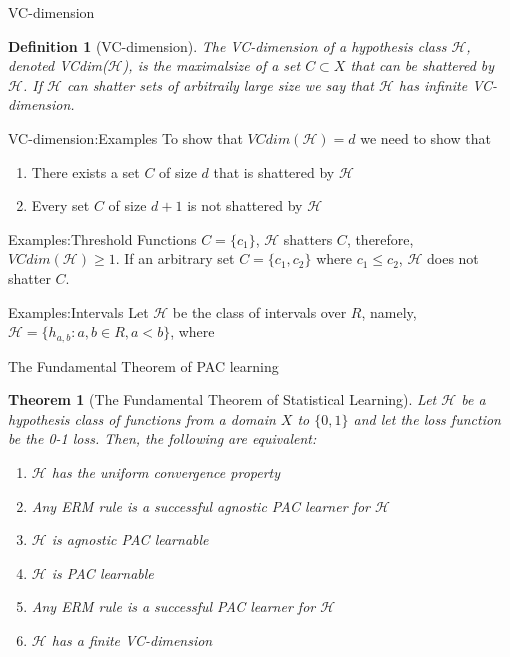 \documentclass{beamer}
\newtheorem*{dfn}{Definition}
\newtheorem{thm}{Theorem}[subsection]
\begin{document}
\begin{frame}{VC-dimension}
	\begin{dfn}[VC-dimension]
		The VC-dimension of a hypothesis class $\mathcal{H}$, denoted VCdim($\mathcal{H}$), is the maximalsize of a set $C \subset X$ that can be shattered by $\mathcal{H}$. If $\mathcal{H}$ can shatter sets of arbitraily large size we say that $\mathcal{H}$ has infinite VC-dimension.
	\end{dfn}
\end{frame}
\begin{frame}{VC-dimension:Examples}
	To show that $VCdim(\mathcal{H})=d$ we need to show that 
	\begin{enumerate}
		\item There exists a set $C$ of size $d$ that is shattered  by $\mathcal{H}$
		\item Every set $C$ of size $d+1$ is not shattered by $\mathcal{H}$
	\end{enumerate}
\end{frame}
\begin{frame}{Examples:Threshold Functions}
	$C=\{c_1\}$, $\mathcal{H}$ shatters $C$, therefore, $VCdim(\mathcal{H}) \geq 1$. If an arbitrary set $C = \{c_1,c_2\}$ where $c_1 \leq c_2$, $\mathcal{H}$ does not shatter $C$.
\end{frame}
\begin{frame}{Examples:Intervals}
	Let $\mathcal{H}$ be the class of intervals over $R$, namely, $\mathcal{H} = \{h_{a,b}:a,b \in R,a<b\}$, where
\end{frame}
\begin{frame}{The Fundamental Theorem of PAC learning}
	\begin{thm}[The Fundamental Theorem of Statistical Learning]
		Let $\mathcal{H}$ be a hypothesis class of functions from a domain $X$ to $\{0,1\}$ and let the loss function be the 0-1 loss. Then, the following are equivalent:
		\begin{enumerate}
			\item $\mathcal{H}$ has the uniform convergence property
			\item Any ERM rule is a successful agnostic PAC learner for $\mathcal{H}$
			\item $\mathcal{H}$ is agnostic PAC learnable
			\item $\mathcal{H}$ is PAC learnable
			\item Any ERM rule is a successful PAC learner for $\mathcal{H}$
			\item $\mathcal{H}$ has a finite VC-dimension
		\end{enumerate}
	\end{thm}
\end{frame}
\end{document}
